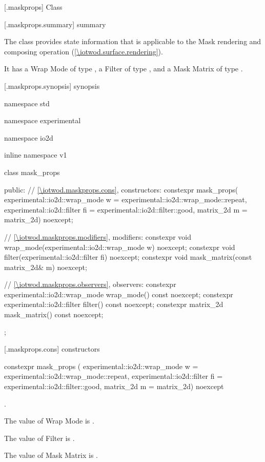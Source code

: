 
 [\iotwod.maskprops] {Class }

 [\iotwod.maskprops.summary] { summary}

\pnum
The  class provides state information that is applicable to the Mask rendering and composing operation (\ref{\iotwod.surface.rendering}).

\pnum
It has a Wrap Mode of type , a Filter of type , and a Mask Matrix of type .

 [\iotwod.maskprops.synopsis] { synopsis}

\begin{codeblock}
namespace std { namespace experimental { namespace io2d { inline namespace v1 {
  class mask_props {
  public:
    // \ref{\iotwod.maskprops.cons}, constructors:
    constexpr mask_props(
      experimental::io2d::wrap_mode w = experimental::io2d::wrap_mode::repeat,
      experimental::io2d::filter fi = experimental::io2d::filter::good,
      matrix_2d m = matrix_2d{}) noexcept;

    // \ref{\iotwod.maskprops.modifiers}, modifiers:
    constexpr void wrap_mode(experimental::io2d::wrap_mode w) noexcept;
    constexpr void filter(experimental::io2d::filter fi) noexcept;
    constexpr void mask_matrix(const matrix_2d& m) noexcept;

    // \ref{\iotwod.maskprops.observers}, observers:
    constexpr experimental::io2d::wrap_mode wrap_mode() const noexcept;
    constexpr experimental::io2d::filter filter() const noexcept;
    constexpr matrix_2d mask_matrix() const noexcept;
  };
}}}}
\end{codeblock}

 [\iotwod.maskprops.cons] { constructors}

\begin{itemdecl}
constexpr mask_props (
  experimental::io2d::wrap_mode w = experimental::io2d::wrap_mode::repeat,
  experimental::io2d::filter fi = experimental::io2d::filter::good,
  matrix_2d m = matrix_2d{}) noexcept    
\end{itemdecl}
\begin{itemdescr}
\onecolumn
\requires
{}.

\pnum
\effects
The value of Wrap Mode is .

\pnum
The value of Filter is .

\pnum
The value of Mask Matrix is .
\end{itemdescr}

